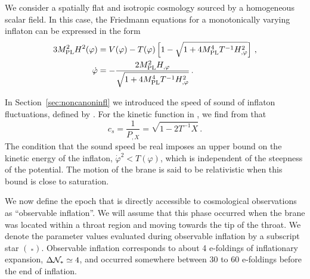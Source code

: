 We consider a spatially flat and isotropic cosmology 
sourced by a homogeneous scalar field. 
In this case, the Friedmann equations for a monotonically 
varying inflaton can be expressed in the form \cite{brane6} 
% 
\begin{align}
\label{eq:Friedmann-dbiintro}
3 M_{\mathrm{PL}}^2 H^2(\varphi ) &= V(\varphi ) -T(\varphi ) 
\left[ 1- \sqrt{1+4M_{\mathrm{PL}}^4T^{-1} H_{,\varphi}^2} \right] \,,\\
\label{eq:phidot-useful}
\dot{\varphi} &= - \frac{2M_{\mathrm{PL}}^2H_{,\varphi}}{\sqrt{1+4M_{\mathrm{PL}}^4 T^{-1} H_{,\varphi}^2}}
\,.
\end{align}
% 

In Section~\ref{sec:noncanoninfl} we introduced the speed of sound of
inflaton fluctuations, defined by . For the kinetic function in
, we find from
 that
% 
\begin{equation}
\label{eq:csdefn-dbiintro}
c_s = \frac{1}{P_{,X}} = \sqrt{1 -2T^{-1}X}  \,.
\end{equation}
% 
The condition that the sound speed be real 
imposes an upper bound on the kinetic energy 
of the inflaton, $\dot{\varphi}^2 < T(\varphi)$, which 
is independent of the steepness of the potential.
The motion of the brane is said to be relativistic when this bound is 
close to saturation.
 
We now define the epoch that is directly 
accessible to cosmological observations as ``observable inflation''. 
We will assume that this phase 
occurred when the brane was located within a 
throat region and moving towards the tip of the throat. 
We denote the parameter values 
evaluated during observable inflation by a subscript star
$(~_*)$. Observable inflation corresponds to about 4 e-foldings  
of inflationary expansion, $\Delta \mathcal{N}_* \simeq 4$,
and occurred somewhere between 30 to 60 e-foldings before the
end of inflation. 



